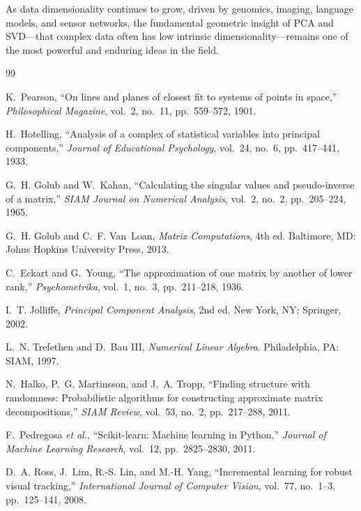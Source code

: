 \documentclass[conference]{IEEEtran}
\begin{document}
As data dimensionality continues to grow, driven by genomics, imaging, language models, and sensor networks, the fundamental geometric insight of PCA and SVD---that complex data often has low intrinsic dimensionality---remains one of the most powerful and enduring ideas in the field.

\begin{thebibliography}{99}

K.~Pearson, ``On lines and planes of closest fit to systems of points in space,'' \textit{Philosophical Magazine}, vol.~2, no.~11, pp.~559--572, 1901.

H.~Hotelling, ``Analysis of a complex of statistical variables into principal components,'' \textit{Journal of Educational Psychology}, vol.~24, no.~6, pp.~417--441, 1933.

G.~H. Golub and W.~Kahan, ``Calculating the singular values and pseudo-inverse of a matrix,'' \textit{SIAM Journal on Numerical Analysis}, vol.~2, no.~2, pp.~205--224, 1965.

G.~H. Golub and C.~F. Van~Loan, \textit{Matrix Computations}, 4th ed. Baltimore, MD: Johns Hopkins University Press, 2013.

C.~Eckart and G.~Young, ``The approximation of one matrix by another of lower rank,'' \textit{Psychometrika}, vol.~1, no.~3, pp.~211--218, 1936.

I.~T. Jolliffe, \textit{Principal Component Analysis}, 2nd ed. New York, NY: Springer, 2002.

L.~N. Trefethen and D.~Bau III, \textit{Numerical Linear Algebra}. Philadelphia, PA: SIAM, 1997.

N.~Halko, P.~G. Martinsson, and J.~A. Tropp, ``Finding structure with randomness: Probabilistic algorithms for constructing approximate matrix decompositions,'' \textit{SIAM Review}, vol.~53, no.~2, pp.~217--288, 2011.

F.~Pedregosa \textit{et al.}, ``Scikit-learn: Machine learning in Python,'' \textit{Journal of Machine Learning Research}, vol.~12, pp.~2825--2830, 2011.

D.~A. Ross, J.~Lim, R.-S. Lin, and M.-H. Yang, ``Incremental learning for robust visual tracking,'' \textit{International Journal of Computer Vision}, vol.~77, no.~1--3, pp.~125--141, 2008.


\end{thebibliography}
\end{document}
